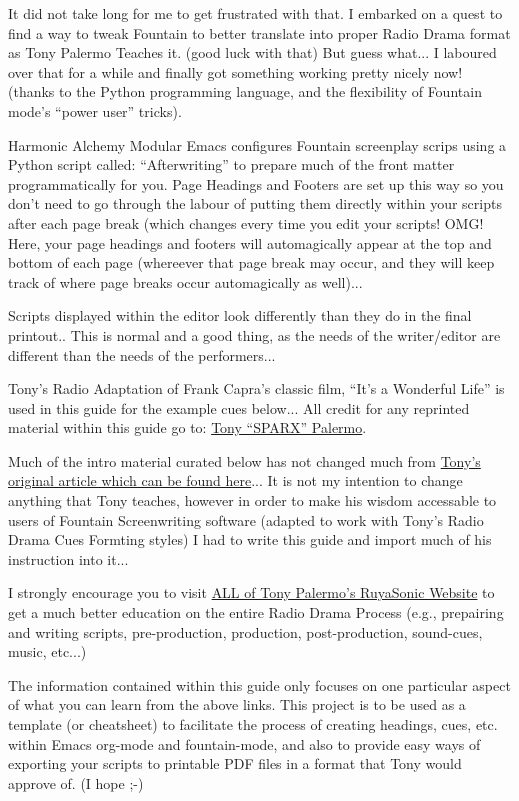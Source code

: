 \documentclass[openleft,oneside,showtrims]{memoir}
\begin{document}
It did not take long for me to get frustrated with that.  I embarked on a quest to find a way to tweak Fountain to better translate into proper Radio Drama format as Tony Palermo Teaches it. (good luck with that) But guess what...  I laboured over that for a while and finally got something working pretty nicely now! (thanks to the Python programming language, and the flexibility of Fountain mode's ``power user'' tricks).

Harmonic Alchemy Modular Emacs configures Fountain screenplay scrips using a Python script called: ``Afterwriting'' to prepare much of the front matter programmatically for you. Page Headings and Footers are set up this way so you don't need to go through the labour of putting them directly within your scripts after each page break (which changes every time you edit your scripts! OMG!  Here, your page headings and footers will automagically appear at the top and bottom of each page (whereever that page break may occur, and they will keep track of where page breaks occur automagically as well)...

Scripts displayed within the editor look differently than they do in the final printout.. This is normal and a good thing, as the needs of the writer/editor are different than the needs of the performers...

Tony's Radio Adaptation of Frank Capra's classic film, “It’s a Wonderful Life” is used in this guide for the example cues below... All credit for any reprinted material within this guide go to: \href{https://www.ruyasonic.com/tpalermo.htm}{Tony ``SPARX'' Palermo}.

Much of the intro material curated below has not changed much from \href{https://www.ruyasonic.com/wrt\_cues.htm}{Tony's original article which can be found here}... It is not my intention to change anything that Tony teaches, however in order to make his wisdom accessable to users of Fountain Screenwriting software (adapted to work with Tony's Radio Drama Cues Formting styles) I had to write this guide and import much of his instruction into it...

I strongly encourage you to visit \href{https://www.ruyasonic.com/}{ALL of Tony Palermo's RuyaSonic Website} to get a much better education on the entire Radio Drama Process (e.g., prepairing and writing scripts, pre-production, production, post-production, sound-cues, music, etc...) 

The information contained within this guide only focuses on one particular aspect of what you can learn from the above links.  This project is to be used as a template (or cheatsheet) to facilitate the process of creating headings, cues, etc. within Emacs org-mode and fountain-mode, and also to provide easy ways of exporting your scripts to printable PDF files in a format that Tony would approve of. (I hope ;-) 
\end{document}
